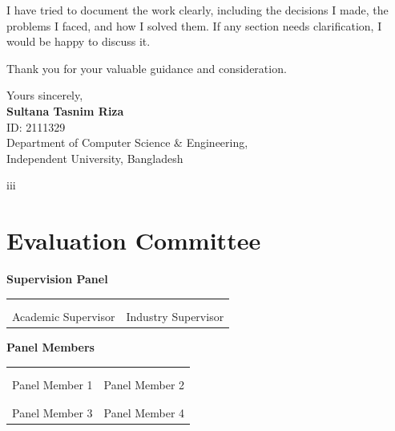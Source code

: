 \documentclass[12pt,a4paper,oneside]{report}
\newcommand{\studentName}{Sultana Tasnim Riza}
\newcommand{\studentId}{2111329}
\newcommand{\departmentName}{Department of Computer Science \& Engineering}
\newcommand{\universityName}{Independent University, Bangladesh}
\begin{document}
\vspace{0.3cm}
I have tried to document the work clearly, including the decisions I made, the problems I faced, and how I solved them. If any section needs clarification, I would be happy to discuss it.

\vspace{0.3cm}
Thank you for your valuable guidance and consideration.

\vspace{1.5cm}
\noindent
Yours sincerely,\\[0.8cm]
\textbf{\studentName} \\
ID: \studentId \\
\departmentName, \\
\universityName

\vfill
\begin{center}\small iii\end{center}

\newpage
\chapter*{Evaluation Committee}

\vspace{0.5cm}
\noindent\textbf{Supervision Panel}
\vspace{0.2cm}

\begin{center}
\begin{tabular}{|p{}|p{}|}
\hline
\vspace{1.8cm} & \vspace{1.8cm} \\
\centering\dotfill & \centering\dotfill \tabularnewline
\centering Academic Supervisor & \centering Industry Supervisor \tabularnewline
\hline
\end{tabular}
\end{center}

\vspace{0.8cm}
\noindent\textbf{Panel Members}
\vspace{0.2cm}

\begin{center}
\begin{tabular}{|p{}|p{}|}
\hline
\vspace{1.4cm} & \vspace{1.4cm} \\
\centering\dotfill & \centering\dotfill \tabularnewline
\centering Panel Member 1 & \centering Panel Member 2 \tabularnewline
\hline
\vspace{1.4cm} & \vspace{1.4cm} \\
\centering\dotfill & \centering\dotfill \tabularnewline
\centering Panel Member 3 & \centering Panel Member 4 \tabularnewline
\hline
\end{tabular}
\end{center}
\end{document}
